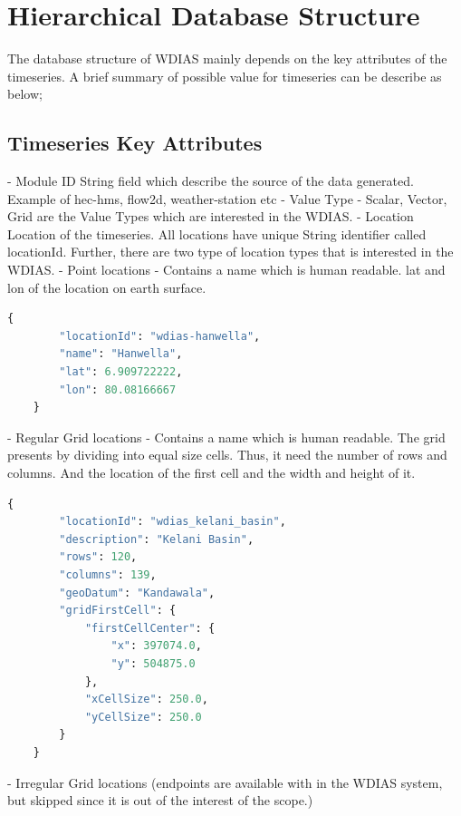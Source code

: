 \section{Hierarchical Database Structure}

The database structure of WDIAS mainly depends on the key attributes of the timeseries. A brief summary of possible value for timeseries can be describe as below;

\subsection{Timeseries Key Attributes}
\label{sub:timeseries_key_attributes}
- Module ID
  String field which describe the source of the data generated. Example of hec-hms, flow2d, weather-station etc
- Value Type
  - Scalar, Vector, Grid are the Value Types which are interested in the WDIAS.
- Location
  Location of the timeseries. All locations have unique String identifier called locationId. Further, there are two type of location types that is interested in the WDIAS.
  - Point locations - Contains a name which is human readable. lat and lon of the location on earth surface.
  \begin{lstlisting}[language=Python]
    {
        "locationId": "wdias-hanwella",
        "name": "Hanwella",
        "lat": 6.909722222,
        "lon": 80.08166667
    }
  \end{lstlisting}
 
  - Regular Grid locations - Contains a name which is human readable. The grid presents by dividing into equal size cells. Thus, it need the number of rows and columns. 
  And the location of the first cell and the width and height of it.
  \begin{lstlisting}[language=Python]
      {
        "locationId": "wdias_kelani_basin",
        "description": "Kelani Basin",
        "rows": 120,
        "columns": 139,
        "geoDatum": "Kandawala",
        "gridFirstCell": {
            "firstCellCenter": {
                "x": 397074.0,
                "y": 504875.0
            },
            "xCellSize": 250.0,
            "yCellSize": 250.0
        }
    }
\end{lstlisting}
  - Irregular Grid locations (endpoints are available with in the WDIAS system, but skipped since it is out of the interest of the scope.)

